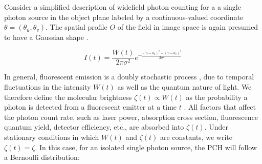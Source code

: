 Consider a simplified description of widefield photon counting for a a single photon source in the object plane labeled by a continuous-valued coordinate $\theta=(\theta_u,\theta_v)$. The spatial profile $O$ of the field in image space is again presumed to have a Gaussian shape \parencite{Zhang2007,Richards1959,Gibson1989}. 

\begin{equation}
I(t)=\frac{W(t)}{2\pi\sigma^2}e^{-\frac{\left(u-\theta_u\right)^2+\left(v-\theta_v\right)^2}{2\sigma^2}}  
\end{equation}

In general, fluorescent emission is a doubly stochastic process \parencite{Chen1999}, due to temporal fluctuations in the intensity $W(t)$ as well as the quantum nature of light. We therefore define the molecular brightness $\zeta(t)\propto W(t)$ as the probability a photon is detected from a fluorescent emitter at a time $t$ . All factors that affect the photon count rate, such as laser power, absorption cross section, fluorescence quantum yield, detector efficiency, etc., are absorbed into $\zeta(t)$. Under stationary conditions in which $W(t)$ and $\zeta(t)$ are constants, we write $\zeta(t)=\zeta$. In this case, for an isolated single photon source, the PCH will follow a Bernoulli distribution: 




